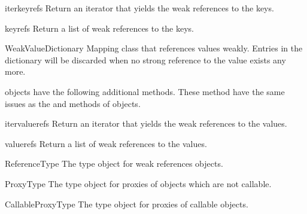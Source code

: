 \begin{methoddesc}{iterkeyrefs}{}
  Return an iterator that yields the weak references to the keys.
\end{methoddesc}

\begin{methoddesc}{keyrefs}{}
  Return a list of weak references to the keys.
\end{methoddesc}

\begin{classdesc}{WeakValueDictionary}{}
  Mapping class that references values weakly.  Entries in the
  dictionary will be discarded when no strong reference to the value
  exists any more.

\end{classdesc}

 objects have the following additional
methods.  These method have the same issues as the
 and  methods of
 objects.

\begin{methoddesc}{itervaluerefs}{}
  Return an iterator that yields the weak references to the values.
\end{methoddesc}

\begin{methoddesc}{valuerefs}{}
  Return a list of weak references to the values.
\end{methoddesc}

\begin{datadesc}{ReferenceType}
  The type object for weak references objects.
\end{datadesc}

\begin{datadesc}{ProxyType}
  The type object for proxies of objects which are not callable.
\end{datadesc}

\begin{datadesc}{CallableProxyType}
  The type object for proxies of callable objects.
\end{datadesc}

